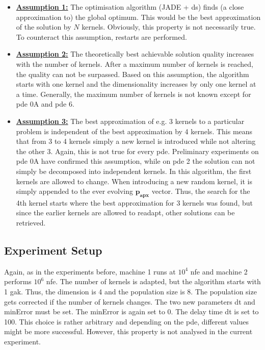 \documentclass[./\jobname.tex]{subfiles}
\begin{document}
\begin{itemize}
	\item \underline{\textbf{Assumption 1:}} The optimisation algorithm (JADE + \gls{ds}) finds (a close approximation to) the global optimum. This would be the best approximation of the solution by $N$ kernels. Obviously, this property is not necessarily true. To counteract this assumption, restarts are performed. 
	\item \underline{\textbf{Assumption 2:}} The theoretically best achievable solution quality increases with the number of kernels. After a maximum number of kernels is reached, the quality can not be surpassed. Based on this assumption, the algorithm starts with one kernel and the dimensionality increases by only one kernel at a time. Generally, the maximum number of kernels is not known except for \gls{pde} 0A and \gls{pde} 6. 
	\item \underline{\textbf{Assumption 3:}} The best approximation of e.g. 3 kernels to a particular problem is independent of the best approximation by 4 kernels. This means that from 3 to 4 kernels simply a new kernel is introduced while not altering the other 3. Again, this is not true for every \gls{pde}. Preliminary experiments on \gls{pde} 0A have confirmed this assumption, while on \gls{pde} 2 the solution can not simply be decomposed into independent kernels. 
	In this algorithm, the first kernels are allowed to change. When introducing a new random kernel, it is simply appended to the ever evolving $\mathbf{p_{apx}}$ vector. Thus, the search for the 4th kernel starts where the best approximation for 3 kernels was found, but since the earlier kernels are allowed to readapt, other solutions can be retrieved.
\end{itemize} 
\subsection{Experiment Setup}
Again, as in the experiments before, machine 1 runs at $10^4$ \gls{nfe} and machine 2 performs $10^6$ \gls{nfe}. The number of kernels is adapted, but the algorithm starts with 1 \gls{gak}. Thus, the dimension is 4 and the population size is 8. The population size gets corrected if the number of kernels changes. The two new parameters \gls{dt} and minError must be set. The minError is again set to 0. The delay time \gls{dt} is set to 100. This choice is rather arbitrary and depending on the \gls{pde}, different values might be more successful. However, this property is not analysed in the current experiment.
\end{document}
